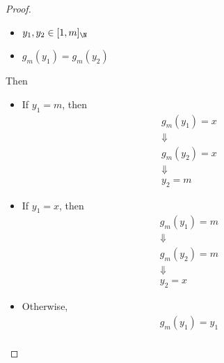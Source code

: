\begin{proof}
\begin{enumerate}[label=\textbf{(\Alph*)}]
\begin{itemize}
\begin{itemize}
\begin{itemize}
                                  \begin{itemize}
                                    \item $y_{1}, y_{2} \in [1, m]_{\N}$
                                    \item $g_{m}(y_{1}) = g_{m}(y_{2})$
                                  \end{itemize}
                                  Then
                                  \begin{itemize}
                                    \item If $y_{1} = m$, then
                                          \[
                                            \begin{array}{c}
                                              g_{m}(y_{1}) = x \\
                                              \Downarrow       \\
                                              g_{m}(y_{2}) = x \\
                                              \Downarrow       \\
                                              y_{2} = m
                                            \end{array}
                                          \]
                                    \item If $y_{1} = x$, then
                                          \[
                                            \begin{array}{c}
                                              g_{m}(y_{1}) = m \\
                                              \Downarrow       \\
                                              g_{m}(y_{2}) = m \\
                                              \Downarrow       \\
                                              y_{2} = x
                                            \end{array}
                                          \]
                                    \item Otherwise,
                                          \[
                                            \begin{array}{c}
                                              g_{m}(y_{1}) = y_{1}                                         \\

\end{array}\]
\end{itemize}
\end{itemize}
\end{itemize}
\end{itemize}
\end{enumerate}
\end{proof}

